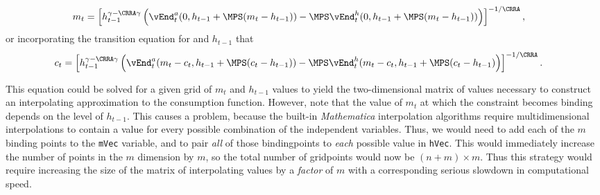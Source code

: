 \documentclass[titlepage, headings=optiontotocandhead]{\econtex}
\newcommand{\Mma}{\textit{Mathematica}}
\begin{document}
{  \begin{equation}\begin{gathered}\begin{aligned}
        {m}_{t}  & = \left[h_{t-1}^{\gamma-\CRRA\gamma} \left(\vEnd_{t}^{{a}}(0,h_{t-1}+\MPS({m}_{t}-h_{t-1}))-\MPS \vEnd_{t}^{h}(0,h_{t-1}+\MPS({m}_{t}-h_{t-1}))\right)  \right]^{-1/\CRRA}, \label{eq:LCbindsHabits}
      \end{aligned}\end{gathered}\end{equation}
  or incorporating the transition equation for
  and $h_{t-1}$ that
  \begin{equation}\begin{gathered}\begin{aligned}
        {c}_{t}  & = \left[h_{t-1}^{\gamma-\CRRA\gamma}
          \left(\vEnd_{t}^{{a}}({m}_{t}-{c}_{t},h_{t-1}+\MPS({c}_{t}-h_{t-1}))
            -\MPS \vEnd_{t}^{h}({m}_{t}-{c}_{t},h_{t-1}+\MPS({c}_{t}-h_{t-1})\right)
        \right]^{-1/\CRRA}. \nonumber
      \end{aligned}\end{gathered}\end{equation}

  This equation could be solved for a given grid of ${m}_{t}$ and
  $h_{t-1}$ values to yield the two-dimensional matrix of values
  necessary to construct an interpolating approximation to the
  consumption function.  However, note that the value of ${m}_{t}$ at
  which the constraint becomes binding depends on the level of
  $h_{t-1}$.  This causes a problem, because the built-in {\Mma}
  interpolation algorithms require multidimensional interpolations to
  contain a value for every possible combination of the independent
  variables.  Thus, we would need to add each of the $m$ binding
  points to the \texttt{mVec} variable, and to pair \textit{all} of
  those bindingpoints to \textit{each} possible value in \texttt{hVec}.
  This would immediately increase the number of points in the ${m}$
  dimension by $m$, so the total number of gridpoints would now be
  $(n+m) \times m$.  Thus this strategy would require increasing the
  size of the matrix of interpolating values by a \textit{factor} of $m$
  with a corresponding serious slowdown in computational speed.

}
\end{document}
